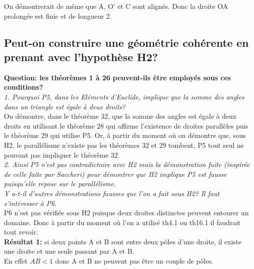 \documentclass[a4paper, 12pt, twoside]{book}
\begin{document}
   On démontrerait de même que A, O' et C sont alignés. Donc la droite OA prolongée est finie et de longueur $2$.\\
   
   
   
 
   
   \subsection{ Peut-on construire une géométrie cohérente en prenant avec l'hypothèse H2?}
 

 
 \textbf{Question: les théorèmes 1 à 26 peuvent-ils être employés sous ces conditions?}\\
 
  
 

  
  \textit{1. Pourquoi P5, dans les Eléments d'Euclide, implique que la somme des angles dans un triangle est égale à deux droits?}\\
  
  On démontre, dans le théorème 32, que la somme des angles est égale à deux droits en utilisant le théorème 28 qui affirme l'existence de droites parallèles puis le théorème 29 qui utilise P5. Or, à partir du moment où on démontre que, sous H2, le parallélisme n'existe pas les théorèmes 32 et 29 tombent, P5 tout seul ne pouvant pas impliquer le théorème 32.\\
  
   \textit{2. Ainsi P5 n'est pas contradictoire avec H2 mais la démonstration faite (inspirée de celle faite par Saccheri) pour démontrer que H2 implique P5 est fausse puisqu'elle repose sur le parallélisme.}\\
   
   \textit{Y a-t-il d'autres démonstrations fausses que l'on a fait sous H2? Il faut s'intéresser à P6.}\\
   
   P6 n'est pas vérifiée sous H2 puisque deux droites distinctes peuvent entourer un domaine. Donc à partir du moment où l'on a utilisé th4.1 ou th16.1 il faudrait tout revoir.\\
   
   \textbf{Résultat 1:} si deux points A et B sont entre deux pôles d'une droite, il existe une droite et une seule passant par A et B.\\
   
    En effet $AB<1$ donc A et B ne peuvent pas être un couple de pôles.\\
    
\end{document}
